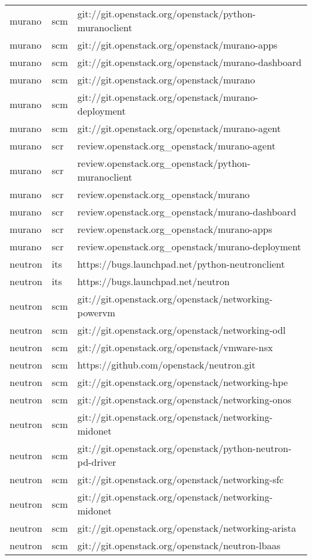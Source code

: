 \begin{center}
\begin{longtable}{|p{4cm}|p{1cm}|p{10cm}|}
murano&scm&git://git.openstack.org/openstack/python-muranoclient\\ 
murano&scm&git://git.openstack.org/openstack/murano-apps\\ 
murano&scm&git://git.openstack.org/openstack/murano-dashboard\\ 
murano&scm&git://git.openstack.org/openstack/murano\\ 
murano&scm&git://git.openstack.org/openstack/murano-deployment\\ 
murano&scm&git://git.openstack.org/openstack/murano-agent\\ 
murano&scr&review.openstack.org\_openstack/murano-agent\\ 
murano&scr&review.openstack.org\_openstack/python-muranoclient\\ 
murano&scr&review.openstack.org\_openstack/murano\\ 
murano&scr&review.openstack.org\_openstack/murano-dashboard\\ 
murano&scr&review.openstack.org\_openstack/murano-apps\\ 
murano&scr&review.openstack.org\_openstack/murano-deployment\\ 
neutron&its&https://bugs.launchpad.net/python-neutronclient\\ 
neutron&its&https://bugs.launchpad.net/neutron\\ 
neutron&scm&git://git.openstack.org/openstack/networking-powervm\\ 
neutron&scm&git://git.openstack.org/openstack/networking-odl\\ 
neutron&scm&git://git.openstack.org/openstack/vmware-nsx\\ 
neutron&scm&https://github.com/openstack/neutron.git\\ 
neutron&scm&git://git.openstack.org/openstack/networking-hpe\\ 
neutron&scm&git://git.openstack.org/openstack/networking-onos\\ 
neutron&scm&git://git.openstack.org/openstack/networking-midonet\\ 
neutron&scm&git://git.openstack.org/openstack/python-neutron-pd-driver\\ 
neutron&scm&git://git.openstack.org/openstack/networking-sfc\\ 
neutron&scm&git://git.openstack.org/openstack/networking-midonet\\ 
neutron&scm&git://git.openstack.org/openstack/networking-arista\\ 
neutron&scm&git://git.openstack.org/openstack/neutron-lbaas\\ 

\end{longtable}
\end{center}
